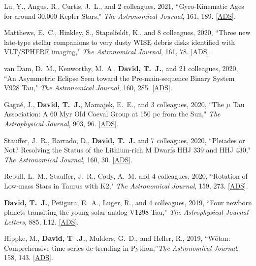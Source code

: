 \item {Lu}, Y., {Angus}, R., {Curtis}, J.~L., and 2 colleagues, 2021, ``{Gyro-Kinematic Ages for around 30,000 Kepler Stars}," \textit{The Astronomical Journal}, 161, 189. \href{https://ui.adsabs.harvard.edu/abs/2021AJ....161..189L/abstract}{[ADS]}.

\item {Matthews}, E.~C., {Hinkley}, S., {Stapelfeldt}, K., and 8 colleagues, 2020, ``{Three new late-type stellar companions to very dusty WISE debris disks identified with VLT/SPHERE imaging}," \textit{The Astronomical Journal}, 161, 78. \href{https://ui.adsabs.harvard.edu/abs/2021AJ....161...78M/abstract}{[ADS]}.

\item {van Dam}, D.~M., {Kenworthy}, M.~A., {\bf {David}, T.~J.}, and 21 colleagues, 2020, ``{An Asymmetric Eclipse Seen toward the Pre-main-sequence Binary System V928 Tau}," \textit{The Astronomical Journal}, 160, 285. \href{https://ui.adsabs.harvard.edu/abs/2020AJ....160..285V/abstract}{[ADS]}.

\item {Gagn{\'e}}, J., {\bf {David}, T.~J.}, {Mamajek}, E.~E., and 3 colleagues, 2020, ``{The {\ensuremath{\mu}} Tau Association: A 60 Myr Old Coeval Group at 150 pc from the Sun}," \textit{The Astrophysical Journal}, 903, 96. \href{https://ui.adsabs.harvard.edu/abs/2020ApJ...903...96G/abstract}{[ADS]}.

\item {Stauffer}, J.~R., {Barrado}, D., {\bf {David}, T.~J.} and 7 colleagues, 2020, ``{Pleiades or Not? Resolving the Status of the Lithium-rich M Dwarfs HHJ 339 and HHJ 430}," \textit{The Astronomical Journal}, 160, 30. \href{https://ui.adsabs.harvard.edu/abs/2020AJ....160...30S/abstract}{[ADS]}.

\item {Rebull}, L.~M., {Stauffer}, J.~R., {Cody}, A.~M. and 4 colleagues, 2020, ``{Rotation of Low-mass Stars in Taurus with K2}," \textit{The Astronomical Journal}, 159, 273. \href{https://ui.adsabs.harvard.edu/abs/2020AJ....159..273R/abstract}{[ADS]}.

\item {\bf {David}, T.~J.}, {Petigura}, E.~A., {Luger}, R., and 4 colleagues, 2019, ``{Four newborn planets transiting the young solar analog V1298 Tau}," \textit{The Astrophysical Journal Letters}, 885, L12. \href{https://ui.adsabs.harvard.edu/abs/2019arXiv191004563D/abstract}{[ADS]}.

\item {Hippke}, M., \textbf{{David}, T~.J.}, {Mulders}, G.~D., and {Heller}, R., 2019, ``{W\={o}tan: Comprehensive time-series de-trending in Python},''\textit{The Astronomical Journal}, 158, 143. \href{https://ui.adsabs.harvard.edu/abs/2019AJ....158..143H/abstract}{[ADS]}.

